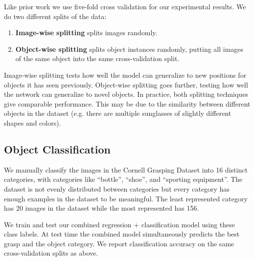 \documentclass[letterpaper, 10 pt, conference]{ieeeconf}
\begin{document}
Like prior work we use five-fold cross validation for our experimental results. We do two different splits of the data:
\begin{enumerate}
\item \textbf{Image-wise splitting} splits images randomly.
\item \textbf{Object-wise splitting} splits object instances randomly, putting all images of the same object into the same cross-validation split.
\end{enumerate}

Image-wise splitting tests how well the model can generalize to new positions for objects it has seen previously. Object-wise splitting goes further, testing how well the network can generalize to novel objects. In practice, both splitting techniques give comparable performance. This may be due to the similarity between different objects in the dataset (e.g. there are multiple sunglasses of slightly different shapes and colors).

\subsection{Object Classification}

We manually classify the images in the Cornell Grasping Dataset into 16 distinct categories, with categories like ``bottle'', ``shoe'', and ``sporting equipment''. The dataset is not evenly distributed between categories but every category has enough examples in the dataset to be meaningful. The least represented category has 20 images in the dataset while the most represented has 156.

We train and test our combined regression + classification model using these class labels. At test time the combined model simultaneously predicts the best grasp and the object category. We report classification accuracy on the same cross-validation splits as above.
\end{document}
